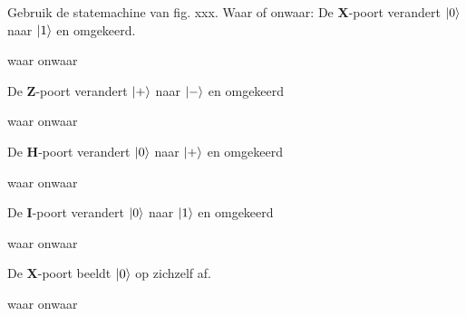 \documentclass[a4paper, addpoints, 12pt
    , answers    %
    ]{exam}
\newcommand*{\port}[1]{\textbf{#1}}
\begin{document}
\begin{questions}
Gebruik de statemachine van fig. xxx. Waar of onwaar:
\question[1]
De \port{X}-poort verandert $\ket{0}$ naar $\ket{1}$ en omgekeerd.

\begin{oneparchoices}
\correctchoice waar
\choice onwaar
\end{oneparchoices}

\question[1]
De \port{Z}-poort verandert $\ket{+}$ naar $\ket{-}$ en omgekeerd

\begin{oneparchoices}
\correctchoice waar 
\choice onwaar
\end{oneparchoices} 
\question[1]
De \port{H}-poort verandert $\ket{0}$ naar $\ket{+}$ en omgekeerd

\begin{oneparchoices}
\correctchoice waar
\choice onwaar
\end{oneparchoices}

\question[1]
De \port{I}-poort verandert $\ket{0}$ naar $\ket{1}$ en omgekeerd

\begin{oneparchoices}
\choice waar
\correctchoice onwaar
\end{oneparchoices}

\question[1]
De \port{X}-poort beeldt $\ket{0}$ op zichzelf af.

\begin{oneparchoices}
\choice waar
\correctchoice onwaar
\end{oneparchoices}

\begin{parts}



\end{parts}
\end{questions}
\end{document}
